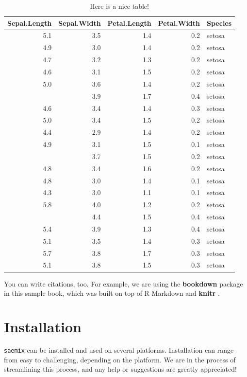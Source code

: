 \documentclass[]{book}
\begin{document}
\begin{table}

\caption{\label{tab:nice-tab}Here is a nice table!}
\centering
\begin{tabular}[t]{rrrrl}
\toprule
Sepal.Length & Sepal.Width & Petal.Length & Petal.Width & Species\\
\midrule
5.1 & 3.5 & 1.4 & 0.2 & setosa\\
4.9 & 3.0 & 1.4 & 0.2 & setosa\\
4.7 & 3.2 & 1.3 & 0.2 & setosa\\
4.6 & 3.1 & 1.5 & 0.2 & setosa\\
5.0 & 3.6 & 1.4 & 0.2 & setosa\\
\addlinespace
5.4 & 3.9 & 1.7 & 0.4 & setosa\\
4.6 & 3.4 & 1.4 & 0.3 & setosa\\
5.0 & 3.4 & 1.5 & 0.2 & setosa\\
4.4 & 2.9 & 1.4 & 0.2 & setosa\\
4.9 & 3.1 & 1.5 & 0.1 & setosa\\
\addlinespace
5.4 & 3.7 & 1.5 & 0.2 & setosa\\
4.8 & 3.4 & 1.6 & 0.2 & setosa\\
4.8 & 3.0 & 1.4 & 0.1 & setosa\\
4.3 & 3.0 & 1.1 & 0.1 & setosa\\
5.8 & 4.0 & 1.2 & 0.2 & setosa\\
\addlinespace
5.7 & 4.4 & 1.5 & 0.4 & setosa\\
5.4 & 3.9 & 1.3 & 0.4 & setosa\\
5.1 & 3.5 & 1.4 & 0.3 & setosa\\
5.7 & 3.8 & 1.7 & 0.3 & setosa\\
5.1 & 3.8 & 1.5 & 0.3 & setosa\\
\bottomrule
\end{tabular}
\end{table}

You can write citations, too. For example, we are using the
\textbf{bookdown} package \citep{R-bookdown} in this sample book, which
was built on top of R Markdown and \textbf{knitr} \citep{xie2015}.

\chapter{Installation}\label{install}

\texttt{saemix} can be installed and used on several platforms.
Installation can range from easy to challenging, depending on the
platform. We are in the process of streamlining this process, and any
help or suggestions are greatly appreciated!
\end{document}
